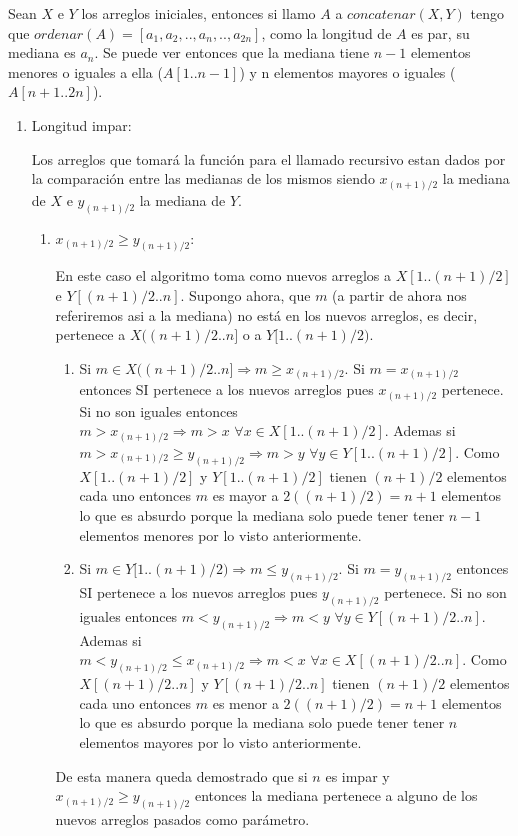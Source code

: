 \documentclass[a4paper,11pt] {article}
\begin{document}
Sean $X$ e $Y$ los arreglos iniciales, entonces si llamo $A$ a $concatenar(X,Y)$ tengo que $ordenar(A)=[a_{1},a_{2},..,a_{n},..,a_{2n}]$, como la longitud de $A$ es par, su mediana es $a_{n}$. Se puede ver entonces que la mediana tiene $n-1$ elementos menores o iguales a ella ($A[1..n-1]$) y n elementos mayores o iguales ($A[n+1..2n]$).

\begin{enumerate}
 \item Longitud impar:
  
Los arreglos que tomar\'a la funci\'on para el llamado recursivo estan dados por la comparaci\'on entre las medianas de los mismos siendo $x_{(n+1)/2}$ la mediana de $X$ e $y_{(n+1)/2}$ la mediana de $Y$.
\begin{enumerate}
\item $x_{(n+1)/2}\geq y_{(n+1)/2}$:

En este caso el algoritmo toma como nuevos arreglos a $X[1..(n+1)/2]$ e $Y[(n+1)/2..n]$. Supongo ahora, que $m$ (a partir de ahora nos referiremos asi a la mediana) no est\'a en los nuevos arreglos, es decir, pertenece a $X((n+1)/2..n]$ o a $Y[1..(n+1)/2)$.
\begin{enumerate}
\item
 Si $m \in X((n+1)/2..n] \Longrightarrow m \geq x_{(n+1)/2}$. Si $m=x_{(n+1)/2}$ entonces SI pertenece a los nuevos arreglos pues $x_{(n+1)/2}$ pertenece. Si no son iguales entonces $m>x_{(n+1)/2} \Longrightarrow m>x \,\,\forall x \in X[1..(n+1)/2]$. Ademas si $m>x_{(n+1)/2}\geq y_{(n+1)/2} \Longrightarrow m>y \,\,\forall y \in Y[1..(n+1)/2]$. Como $X[1..(n+1)/2]$ y $Y[1..(n+1)/2]$ tienen $(n+1)/2$ elementos cada uno entonces $m$ es mayor a $2((n+1)/2)=n+1$ elementos lo que es absurdo porque la mediana solo puede tener tener $n-1$ elementos menores por lo visto anteriormente.
\item
 Si $m \in Y[1..(n+1)/2) \Longrightarrow m \leq y_{(n+1)/2}$. Si $m=y_{(n+1)/2}$ entonces SI pertenece a los nuevos arreglos pues $y_{(n+1)/2}$ pertenece. Si no son iguales entonces $m<y_{(n+1)/2} \Longrightarrow m<y \,\,\forall y \in Y[(n+1)/2..n]$. Ademas si $m<y_{(n+1)/2}\leq x_{(n+1)/2} \Longrightarrow m<x \,\,\forall x \in X[(n+1)/2..n]$. Como $X[(n+1)/2..n]$ y $Y[(n+1)/2..n]$ tienen $(n+1)/2$ elementos cada uno entonces $m$ es menor a $2((n+1)/2)=n+1$ elementos lo que es absurdo porque la mediana solo puede tener tener $n$ elementos mayores por lo visto anteriormente.
\end{enumerate}

De esta manera queda demostrado que si $n$ es impar y $x_{(n+1)/2}\geq y_{(n+1)/2}$ entonces la mediana pertenece a alguno de los nuevos arreglos pasados como par\'ametro.


\end{enumerate}
\end{enumerate}
\end{document}
